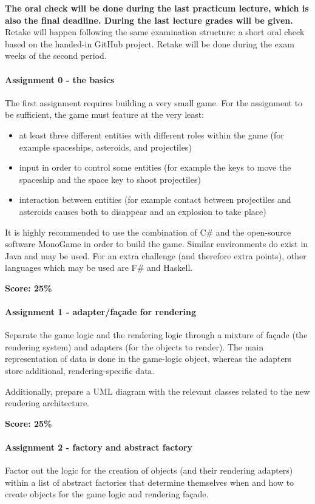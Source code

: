 \documentclass[titlepage,a4paper, 11pt]{article}
\begin{document}
\textbf{The oral check will be done during the last practicum lecture, which is also the final deadline. During the last lecture grades will be given.} Retake will happen following the same examination structure: a short oral check based on the handed-in GitHub project. Retake will be done during the exam weeks of the second period.

\paragraph*{Assignment 0 - the basics}
The first assignment requires building a very small game. For the assignment to be sufficient, the game must feature at the very least:
\begin{itemize}
\item at least three different entities with different roles within the game (for example spaceships, asteroids, and projectiles)
\item input in order to control some entities (for example the keys to move the spaceship and the space key to shoot projectiles)
\item interaction between entities (for example contact between projectiles and asteroids causes both to disappear and an explosion to take place)
\end{itemize}

It is highly recommended to use the combination of C\# and the open-source software MonoGame in order to build the game. Similar environments do exist in Java and may be used. For an extra challenge (and therefore extra points), other languages which may be used are F\# and Haskell.

\textbf{Score: 25\%}


\paragraph*{Assignment 1 - adapter/façade for rendering}
Separate the game logic and the rendering logic through a mixture of façade (the rendering system) and adapters (for the objects to render). The main representation of data is done in the game-logic object, whereas the adapters store additional, rendering-specific data.

Additionally, prepare a UML diagram with the relevant classes related to the new rendering architecture.

\textbf{Score: 25\%}


\paragraph*{Assignment 2 - factory and abstract factory}
Factor out the logic for the creation of objects (and their rendering adapters) within a list of abstract factories that determine themselves when and how to create objects for the game logic and rendering façade.
\end{document}
